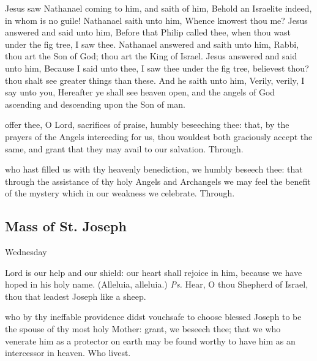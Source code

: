  Jesus saw Nathanael coming to him, and saith of him, Behold an Israelite indeed, in whom is no guile! Nathanael saith unto him, Whence knowest thou me? Jesus answered and said unto him, Before that Philip called thee, when thou wast under the fig tree, I saw thee. Nathanael answered and saith unto him, Rabbi, thou art the Son of God; thou art the King of Israel. Jesus answered and said unto him, Because I said unto thee, I saw thee under the fig tree, believest thou? thou shalt see greater things than these. And he saith unto him, Verily, verily, I say unto you, Hereafter ye shall see heaven open, and the angels of God ascending and descending upon the Son of man.


\secret
{} offer thee, O Lord, sacrifices of praise, humbly beseeching thee: that, by the prayers of the Angels interceding for us, thou wouldest both graciously accept the same, and grant that they may avail to our salvation. Through.


\postcommunion
{} who hast filled us with thy heavenly benediction, we humbly beseech thee: that through the assistance of thy holy Angels and Archangels we may feel the benefit of the mystery which in our weakness we celebrate. Through.


\subsection{Mass of St. Joseph}
\begin{inhead}
	Wednesday
\end{inhead}

\introit
{} Lord is our help and our shield: our heart shall rejoice in him, because we have hoped in his holy name. (Alleluia, alleluia.) \textit{Ps.} Hear, O thou Shepherd of Israel, thou that leadest Joseph like a sheep.

\collect
{} who by thy ineffable providence didst vouchsafe to choose blessed Joseph to be the spouse of thy most holy Mother: grant, we beseech thee; that we who venerate him as a protector on earth may be found worthy to have him as an intercessor in heaven. Who livest.

